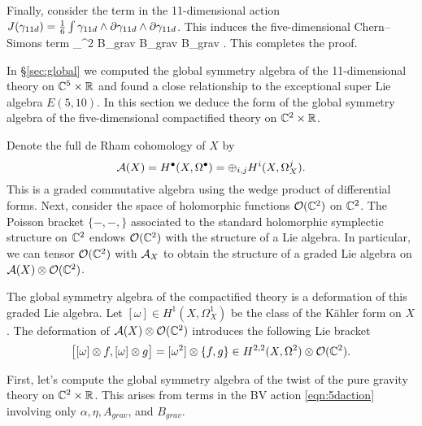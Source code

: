 Finally, consider the term in the 11-dimensional action $J(\gamma_{11d}) = \frac16 \int \gamma_{11d} \wedge \partial \gamma_{11d} \wedge \partial \gamma_{11d}$. 
This induces the five-dimensional Chern--Simons term 
\beqn\label{eqn:5dsugra2}
 \int_{\CC^2 \times \RR} B_{grav} \del B_{grav} \del B_{grav} .
\eeqn
This completes the proof. 

\parsec[s:5dglobal]

In \S \ref{sec:global} we computed the global symmetry algebra of the 11-dimensional theory on $\mathbb C^5 \times \mathbb R$ and found a close relationship to the exceptional super Lie algebra $E(5,10)$. 
In this section we deduce the form of the global symmetry algebra of the five-dimensional compactified theory on $\mathbb C^2 \times \mathbb R$. 

Denote the full de Rham cohomology of $X$ by
\[
\mathcal A(X) = H^\bullet (X, \Omega^\bullet) = \oplus_{i,j} H^i (X, \Omega^j_X)  .
\]
This is a graded commutative algebra using the wedge product of differential forms. 
Next, consider the space of holomorphic functions $\mathcal O(\mathbb C^2)$ on $\mathbb C^2$. 
The Poisson bracket $\{-,-,\}$ associated to the standard holomorphic symplectic structure on $\mathbb C^2$ endows $\mathcal O(\mathbb C^2)$ with the structure of a Lie algebra. 
In particular, we can tensor $\mathcal O(\mathbb C^2)$ with $\mathcal A_X$ to obtain the structure of a graded Lie algebra on $\mathcal A(X) \otimes \mathcal O(\mathbb C^2)$. 

The global symmetry algebra of the compactified theory is a deformation of this graded Lie algebra. 
Let $[\omega] \in H^1(X, \Omega^1_X)$ be the class of the K\"ahler form on $X$. 
The deformation of $\mathcal A(X) \otimes \mathcal O(\mathbb C^2)$ introduces the following Lie bracket 
\[
\big[ [\omega] \otimes f, [\omega] \otimes g\big] = [\omega^2] \otimes \{f,g\} \in H^{2,2}(X, \Omega^2) \otimes \mathcal O(\mathbb C^2) . 
\]


First, let's compute the global symmetry algebra of the twist of the pure gravity theory on $\mathbb C^2 \times \mathbb R$. 
This arises from terms in the BV action \eqref{eqn:5daction} involving only $\alpha, \eta, A_{grav}$, and $B_{grav}$. 

